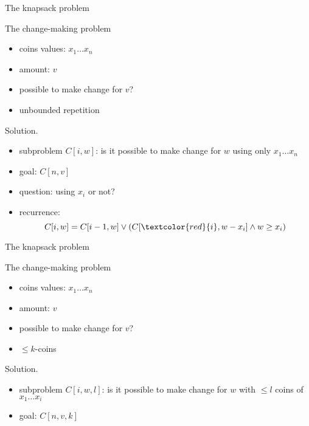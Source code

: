 \begin{frame}{The knapsack problem}
  \begin{exampleblock}{The change-making problem }
    \begin{itemize}
      \item coins values: $x_{1} \dots x_{n}$
      \item amount: $v$
      \item possible to make change for $v$?
      \item unbounded repetition
    \end{itemize}
  \end{exampleblock}
  
  \begin{block}{Solution.}
    \begin{itemize}
      \item subproblem $C[i, w]$: is it possible to make change for $w$ using only $x_{1} \dots x_{n}$
      \item goal: $C[n,v]$
      \item question: using $x_{i}$ or not?
      \item recurrence:
	\[
	  C[i,w] = C[i-1, w] \lor (C[\textcolor{red}{i}, w-x_{i}] \land w \ge x_{i})
	\]
    \end{itemize}
  \end{block}
\end{frame}
\begin{frame}{The knapsack problem}
  \begin{exampleblock}{The change-making problem }
    \begin{itemize}
      \item coins values: $x_{1} \dots x_{n}$
      \item amount: $v$
      \item possible to make change for $v$?
      \item $\le k$-coins 
    \end{itemize}
  \end{exampleblock}

  \begin{block}{Solution.}
    \begin{itemize}
      \item subproblem $C[i,w,l]$: is it possible to make change for $w$ with $\le l$ coins of $x_{1} \dots x_{i}$
      \item goal: $C[n,v,k]$
    \end{itemize}
  \end{block}
\end{frame}
